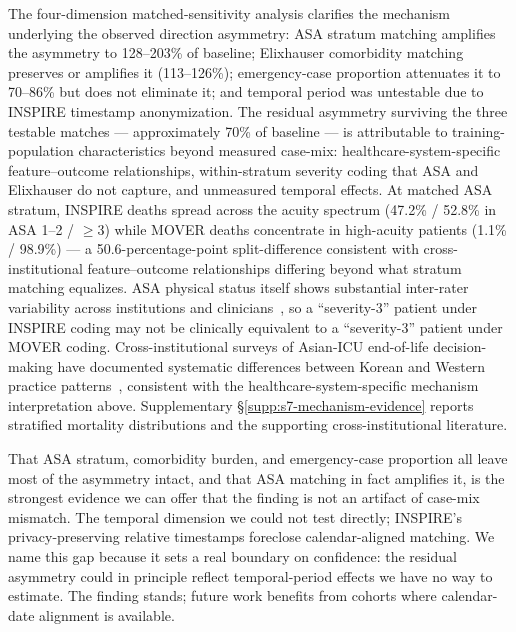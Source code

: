 The four-dimension matched-sensitivity analysis clarifies the mechanism underlying the observed direction asymmetry: ASA stratum matching amplifies the asymmetry to 128--203\% of baseline; Elixhauser comorbidity matching preserves or amplifies it (113--126\%); emergency-case proportion attenuates it to 70--86\% but does not eliminate it; and temporal period was untestable due to INSPIRE timestamp anonymization. The residual asymmetry surviving the three testable matches --- approximately 70\% of baseline --- is attributable to training-population characteristics beyond measured case-mix: healthcare-system-specific feature--outcome relationships, within-stratum severity coding that ASA and Elixhauser do not capture, and unmeasured temporal effects. At matched ASA stratum, INSPIRE deaths spread across the acuity spectrum (47.2\% / 52.8\% in ASA 1--2 / $\geq 3$) while MOVER deaths concentrate in high-acuity patients (1.1\% / 98.9\%) --- a 50.6-percentage-point split-difference consistent with cross-institutional feature--outcome relationships differing beyond what stratum matching equalizes. ASA physical status itself shows substantial inter-rater variability across institutions and clinicians~\cite{Sankar2014}, so a ``severity-3'' patient under INSPIRE coding may not be clinically equivalent to a ``severity-3'' patient under MOVER coding. Cross-institutional surveys of Asian-ICU end-of-life decision-making have documented systematic differences between Korean and Western practice patterns~\cite{Phua2015,Park2018}, consistent with the healthcare-system-specific mechanism interpretation above. Supplementary \S\ref{supp:s7-mechanism-evidence} reports stratified mortality distributions and the supporting cross-institutional literature.

That ASA stratum, comorbidity burden, and emergency-case proportion all leave most of the asymmetry intact, and that ASA matching in fact amplifies it, is the strongest evidence we can offer that the finding is not an artifact of case-mix mismatch. The temporal dimension we could not test directly; INSPIRE's privacy-preserving relative timestamps foreclose calendar-aligned matching. We name this gap because it sets a real boundary on confidence: the residual asymmetry could in principle reflect temporal-period effects we have no way to estimate. The finding stands; future work benefits from cohorts where calendar-date alignment is available.

